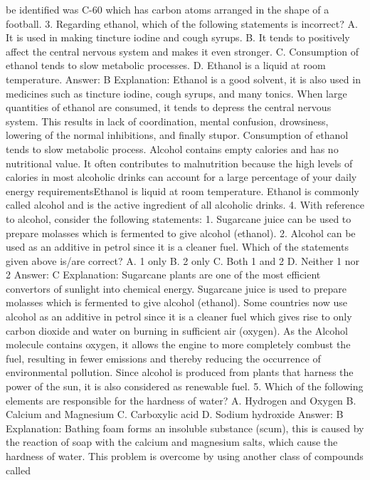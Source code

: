 be identified was C-60 which has carbon atoms arranged in the
shape of a football.
3. Regarding ethanol, which of the following statements is
incorrect?
A. It is used in making tincture iodine and cough syrups.
B. It tends to positively affect the central nervous system and
makes it even stronger.
C. Consumption of ethanol tends to slow metabolic processes.
D. Ethanol is a liquid at room temperature.
Answer: B
Explanation:
Ethanol is a good solvent, it is also used in medicines such as tincture
iodine, cough syrups, and many tonics.
When large quantities of ethanol are consumed, it tends to depress
the central nervous system. This results in lack of coordination,
mental confusion, drowsiness, lowering of the normal inhibitions, and
finally stupor.
Consumption of ethanol tends to slow metabolic process. Alcohol
contains empty calories and has no nutritional value. It often
contributes to malnutrition because the high levels of calories in
most alcoholic drinks can account for a large percentage of your
daily energy requirementsEthanol is liquid at room temperature.
Ethanol is commonly called alcohol and is the active ingredient of all
alcoholic drinks.
4. With reference to alcohol, consider the following statements:
1. Sugarcane juice can be used to prepare molasses which is
fermented to give alcohol (ethanol).
2. Alcohol can be used as an additive in petrol since it is a cleaner
fuel.
Which of the statements given above is/are correct?
A. 1 only
B. 2 only
C. Both 1 and 2
D. Neither 1 nor 2
Answer: C
Explanation: Sugarcane plants are one of the most efficient
convertors of sunlight into chemical energy. Sugarcane juice is used
to prepare molasses which is fermented to give alcohol (ethanol).
Some countries now use alcohol as an additive in petrol since it is a
cleaner fuel which gives rise to only carbon dioxide and water on
burning in sufficient air (oxygen). As the Alcohol molecule contains
oxygen, it allows the engine to more completely combust the fuel,
resulting in fewer emissions and thereby reducing the occurrence of
environmental pollution. Since alcohol is produced from plants that
harness the power of the sun, it is also considered as renewable
fuel.
5. Which of the following elements are responsible for the
hardness of water?
A. Hydrogen and Oxygen
B. Calcium and Magnesium
C. Carboxylic acid
D. Sodium hydroxide
Answer: B
Explanation:
Bathing foam forms an insoluble substance (scum), this is caused by
the reaction of soap with the calcium and magnesium salts, which
cause the hardness of water.
This problem is overcome by using another class of compounds called
